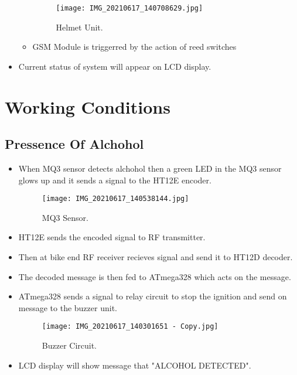 \begin{itemize}
\begin{itemize}
		
		\begin{figure}[h]
			\centering
			\texttt{[image: IMG\_20210617\_140708629.jpg]}
			\caption{Helmet Unit.}
		\end{figure}
		\item GSM Module is triggerred by the action of reed switches	 
	\end{itemize}
	
	\item Current status of system will appear on LCD display.
	
\end{itemize}

\section{Working Conditions}
\subsection{Pressence Of Alchohol}
\begin{itemize}
	\item When MQ3 sensor detects alchohol then a green LED in the MQ3 sensor glows up and it sends a signal to the HT12E encoder.
	\begin{figure}[h]
		\centering
		\texttt{[image: IMG\_20210617\_140538144.jpg]}
		\caption{MQ3 Sensor.}
	\end{figure} 
	\item HT12E sends the encoded signal to RF transmitter.
	\item Then at bike end RF receiver recieves signal and send it to HT12D decoder.
	\item The decoded message is then fed to ATmega328 which acts on the message.
	\item ATmega328 sends a signal to relay circuit to stop the ignition and send on message to the buzzer unit.
	\begin{figure}[h]
		\centering
		\texttt{[image: IMG\_20210617\_140301651 - Copy.jpg]}
		\caption{Buzzer Circuit.}
	\end{figure}
	\item LCD display will show message that "ALCOHOL DETECTED".
\end{itemize}

\pagebreak
